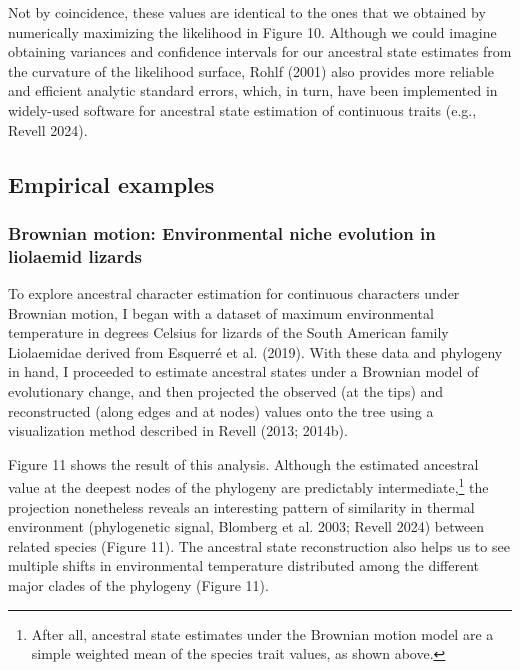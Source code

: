 \documentclass{article}
\begin{document}
Not by coincidence, these values are identical to the ones that we obtained by numerically maximizing the likelihood in Figure 10. Although we could imagine obtaining variances and confidence intervals for our ancestral state estimates from the curvature of the likelihood surface, Rohlf (2001) also provides more reliable and efficient analytic standard errors, which, in turn, have been implemented in widely-used software for ancestral state estimation of continuous traits (e.g., Revell 2024).

\subsection{Empirical examples}\label{empirical-examples-1}

\subsubsection{Brownian motion: Environmental niche evolution in liolaemid lizards}\label{brownian-motion-environmental-niche-evolution-in-liolaemid-lizards}

To explore ancestral character estimation for continuous characters under Brownian motion, I began with a dataset of maximum environmental temperature in degrees Celsius for lizards of the South American family Liolaemidae derived from Esquerré et al. (2019). With these data and phylogeny in hand, I proceeded to estimate ancestral states under a Brownian model of evolutionary change, and then projected the observed (at the tips) and reconstructed (along edges and at nodes) values onto the tree using a visualization method described in Revell (2013; 2014b).

Figure 11 shows the result of this analysis. Although the estimated ancestral value at the deepest nodes of the phylogeny are predictably intermediate,\footnote{After all, ancestral state estimates under the Brownian motion model are a simple weighted mean of the species trait values, as shown above.} the projection nonetheless reveals an interesting pattern of similarity in thermal environment (phylogenetic signal, Blomberg et al. 2003; Revell 2024) between related species (Figure 11). The ancestral state reconstruction also helps us to see multiple shifts in environmental temperature distributed among the different major clades of the phylogeny (Figure 11).
\end{document}
